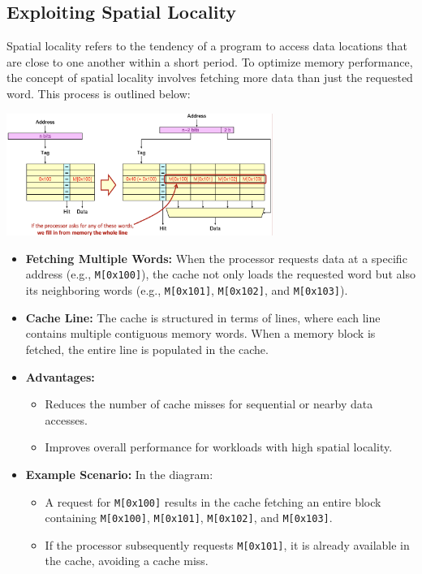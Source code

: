 \subsection{Exploiting Spatial Locality}
Spatial locality refers to the tendency of a program to access data locations that are close to one another within a short period. To optimize memory performance, the concept of spatial locality involves fetching more data than just the requested word. This process is outlined below:
\begin{center}
    \includegraphics[width=0.65\textwidth]{chapters/chapter3a/images/spatial.png}
\end{center}
\begin{itemize}
    \item \textbf{Fetching Multiple Words:} When the processor requests data at a specific address (e.g., \texttt{M[0x100]}), the cache not only loads the requested word but also its neighboring words (e.g., \texttt{M[0x101]}, \texttt{M[0x102]}, and \texttt{M[0x103]}).
    \item \textbf{Cache Line:} The cache is structured in terms of lines, where each line contains multiple contiguous memory words. When a memory block is fetched, the entire line is populated in the cache.
    \item \textbf{Advantages:}
    \begin{itemize}
        \item Reduces the number of cache misses for sequential or nearby data accesses.
        \item Improves overall performance for workloads with high spatial locality.
    \end{itemize}
    \item \textbf{Example Scenario:} In the diagram:
    \begin{itemize}
        \item A request for \texttt{M[0x100]} results in the cache fetching an entire block containing \texttt{M[0x100]}, \texttt{M[0x101]}, \texttt{M[0x102]}, and \texttt{M[0x103]}.
        \item If the processor subsequently requests \texttt{M[0x101]}, it is already available in the cache, avoiding a cache miss.
    \end{itemize}
\end{itemize}

